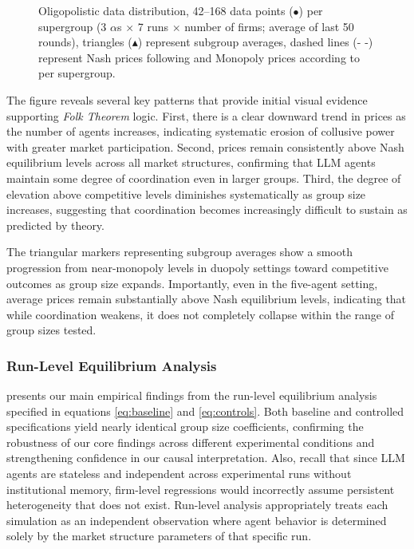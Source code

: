 \begin{figure}[htpb!]
    \centering
    
    \caption{Oligopolistic data distribution, 42--168 data points ($\bullet$) per supergroup (3 $\alpha$s $\times$ 7 runs $\times$ number of firms; average of last 50 rounds), triangles ($\blacktriangle$) represent subgroup averages, dashed lines ($\text{- -}$) represent Nash prices following  and Monopoly prices according to  per supergroup.}
    \label{fig:oligopols}
\end{figure}

The figure reveals several key patterns that provide initial visual evidence supporting \emph{Folk Theorem} logic. First, there is a clear downward trend in prices as the number of agents increases, indicating systematic erosion of collusive power with greater market participation. Second, prices remain consistently above Nash equilibrium levels across all market structures, confirming that LLM agents maintain some degree of coordination even in larger groups. Third, the degree of elevation above competitive levels diminishes systematically as group size increases, suggesting that coordination becomes increasingly difficult to sustain as predicted by theory.

The triangular markers representing subgroup averages show a smooth progression from near-monopoly levels in duopoly settings toward competitive outcomes as group size expands. Importantly, even in the five-agent setting, average prices remain substantially above Nash equilibrium levels, indicating that while coordination weakens, it does not completely collapse within the range of group sizes tested.

\subsubsection*{Run-Level Equilibrium Analysis}

 presents our main empirical findings from the run-level equilibrium analysis specified in equations \ref{eq:baseline} and \ref{eq:controls}. Both baseline and controlled specifications yield nearly identical group size coefficients, confirming the robustness of our core findings across different experimental conditions and strengthening confidence in our causal interpretation. Also, recall that since LLM agents are stateless and independent across experimental runs without institutional memory, firm-level regressions would incorrectly assume persistent heterogeneity that does not exist. Run-level analysis appropriately treats each simulation as an independent observation where agent behavior is determined solely by the market structure parameters of that specific run.

